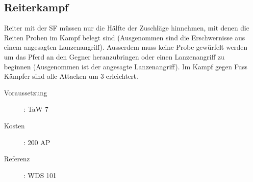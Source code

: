 \subsection{Reiterkampf}
\label{sf.reiterkampf}
Reiter mit der SF  müssen nur die Hälfte der Zuschläge hinnehmen, mit denen die Reiten Proben im Kampf belegt sind (Ausgenommen sind die Erschwernisse aus einem angesagten Lanzenangriff).
Ausserdem muss keine Probe gewürfelt werden um das Pferd an den Gegner heranzubringen oder einen Lanzenangriff zu beginnen (Ausgenommen ist der angesagte Lanzenangriff).
Im Kampf gegen Fuss Kämpfer sind alle Attacken um 3 erleichtert.
\begin{description}
    \item[Voraussetzung]:
        TaW  7
    \item [Kosten]:
        200 AP
    \item [Referenz]:
        WDS 101
\end{description}
